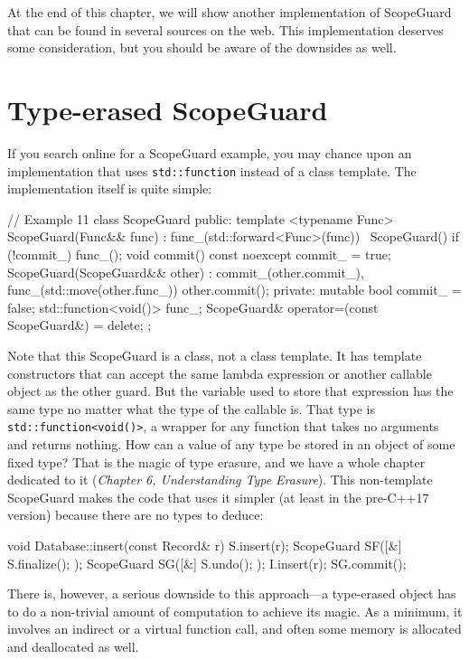 At the end of this chapter, we will show another implementation of ScopeGuard that can be found in several sources on the web. This implementation deserves some consideration, but you should be aware of the downsides as well.

\section{Type-erased ScopeGuard}

If you search online for a ScopeGuard example, you may chance upon an implementation that uses \texttt{std::function} instead of a class template. The implementation itself is quite simple:

\begin{code}
// Example 11
class ScopeGuard {
  public:
  template <typename Func> ScopeGuard(Func&& func) :
    func_(std::forward<Func>(func)) {}
  ~ScopeGuard() { if (!commit_) func_(); }
  void commit() const noexcept { commit_ = true; }
  ScopeGuard(ScopeGuard&& other) :
    commit_(other.commit_), func_(std::move(other.func_)) {
    other.commit();
  }
  private:
  mutable bool commit_ = false;
  std::function<void()> func_;
  ScopeGuard& operator=(const ScopeGuard&) = delete;
};
\end{code}

Note that this ScopeGuard is a class, not a class template. It has template constructors that can accept the same lambda expression or another callable object as the other guard. But the variable used to store that expression has the same type no matter what the type of the callable is. That type is \texttt{std::function\textless{}void()\textgreater{}}, a wrapper for any function that takes no arguments and returns nothing. How can a value of any type be stored in an object of some fixed type? That is the magic of type erasure, and we have a whole chapter dedicated to it (\emph{Chapter 6, Understanding Type Erasure}). This non-template ScopeGuard makes the code that uses it simpler (at least in the pre-C++17 version) because there are no types to deduce:

\begin{code}
void Database::insert(const Record& r) {
  S.insert(r);
  ScopeGuard SF([&] { S.finalize(); });
  ScopeGuard SG([&] { S.undo(); });
  I.insert(r);
  SG.commit();
}
\end{code}

There is, however, a serious downside to this approach---a type-erased object has to do a non-trivial amount of computation to achieve its magic. As a minimum, it involves an indirect or a virtual function call, and often some memory is allocated and deallocated as well.

